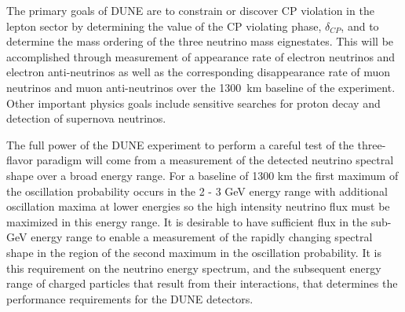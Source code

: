 \label{detbeamtest}

The primary goals of DUNE are to 
constrain or discover CP violation in the lepton sector by determining 
the value of the
CP violating phase, $\delta_{CP}$, and
to determine the mass ordering of the three neutrino mass eignestates. 
This will be accomplished through measurement of 
appearance rate of electron neutrinos and electron anti-neutrinos 
as well as the corresponding disappearance rate of muon neutrinos 
and muon anti-neutrinos over the 1300~km baseline of the experiment. 
Other important physics goals include sensitive searches for proton decay and detection of supernova neutrinos.

The full power of the DUNE experiment to perform a careful test of the three-flavor paradigm will come from a measurement of the detected neutrino spectral shape over a broad energy range.  For a baseline of 1300 km the first maximum of the oscillation probability occurs in the 2 - 3 GeV energy range with additional oscillation maxima at lower energies so the high intensity neutrino flux must be maximized in this energy range. It is desirable to have sufficient flux in the sub-GeV energy range to enable a measurement of the rapidly changing spectral shape in the region of the second maximum in the oscillation probability. It is this requirement on the neutrino energy spectrum, and the subsequent energy range of charged particles that result from their interactions, that determines the performance requirements for the DUNE detectors. 



